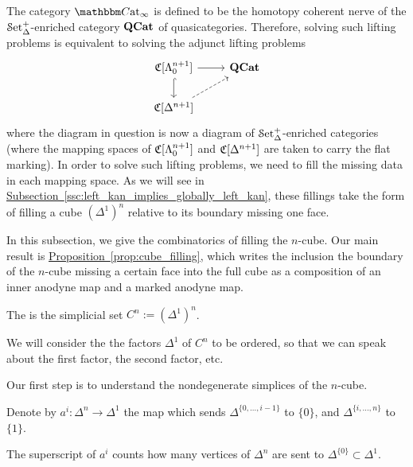 \documentclass[main.tex]{subfiles}
\begin{document}
The category $\ICCat$ is defined to be the homotopy coherent nerve of the $\mathcal{S}\mathrm{et}_{\Delta}^{+}$-enriched category $\mathbf{QCat}$ of quasicategories. Therefore, solving such lifting problems is equivalent to solving the adjunct lifting problems
\begin{equation*}
  \begin{tikzcd}
    \C[\Lambda^{n+1}_{0}]
    \arrow[r]
    \arrow[d, hook]
    & \QCat
    \\
    \C[\Delta^{n+1}]
    \arrow[ur, dashed]
  \end{tikzcd}
\end{equation*}
where the diagram in question is now a diagram of $\mathcal{S}\mathrm{et}_{\Delta}^{+}$-enriched categories (where the mapping spaces of $\mathfrak{C}[\Lambda^{n+1}_{0}]$ and $\mathfrak{C}[\Delta^{n+1}]$ are taken to carry the flat marking). In order to solve such lifting problems, we need to fill the missing data in each mapping space. As we will see in \hyperref[ssc:left_kan_implies_globally_left_kan]{Subsection~\ref*{ssc:left_kan_implies_globally_left_kan}}, these fillings take the form of filling a cube $(\Delta^{1})^{n}$ relative to its boundary missing one face.

In this subsection, we give the combinatorics of filling the $n$-cube. Our main result is \hyperref[prop:cube_filling]{Proposition~\ref*{prop:cube_filling}}, which writes the inclusion the boundary of the $n$-cube missing a certain face into the full cube as a composition of an inner anodyne map and a marked anodyne map.

\begin{definition}
  The  is the simplicial set $C^{n} := (\Delta^{1})^{n}$.
\end{definition}

\begin{note}
  We will consider the the factors $\Delta^{1}$ of $C^{n}$ to be ordered, so that we can speak about the first factor, the second factor, etc.
\end{note}

Our first step is to understand the nondegenerate simplices of the $n$-cube.

\begin{definition}
  Denote by $a^{i}\colon \Delta^{n} \to \Delta^{1}$ the map which sends $\Delta^{\{0, \ldots, i-1\}}$ to $\{0\}$, and $\Delta^{\{i, \ldots, n\}}$ to $\{1\}$.
\end{definition}

\begin{note}
  The superscript of $a^{i}$ counts how many vertices of $\Delta^{n}$ are sent to $\Delta^{\{0\}} \subset \Delta^{1}$.
\end{note}
\end{document}
